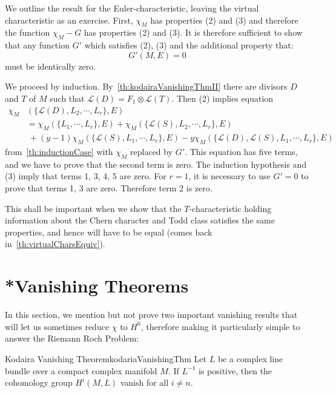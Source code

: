 \documentclass{book}
\newenvironment{Proof}[1][]
  {\begin{ProofTcb}[#1]}
  {\end{ProofTcb}}
\newcommand{\CL}{{\mathcal{L}}}
\begin{document}
\begin{Proof}
  We outline the result for the Euler-characteristic, leaving the virtual characteristic as an exercise.
  First, $\chi_M$ has properties (2) and (3) and therefore the function $\chi_M-G$ has properties (2) and (3).
  It is therefore sufficient to show that any function $G'$ which satisfies (2), (3) and the additional property
  that:
  \[
    G'(M,E)=0
  \]
  must be identically zero.

  We proceed by induction. By~\cref{th:kodairaVanishingThmII} there are divisors $D$ and $T$ of $M$ such that $\CL(D)=F_1\otimes\CL(T)$.
  Then (2) implies equation
  \begin{align*}
    \chi_M&(\{ \CL(D),L_2,\cdots,L_r \},E)\\
    &= \chi_M(\{ L_1,\cdots,L_r \},E) + \chi_M(\{ \CL(S),L_2,\cdots,L_r \},E) \\
                        &\ + (y-1)\chi_M(\{\CL(S),L_1,\cdots,L_r\},E)
                        - y\chi_M(\{\CL(D),\CL(S),L_1,\cdots,L_r\},E)
  \end{align*}
  from~\cref{th:inductionCase} with $\chi_M$ replaced by $G'$. This equation has five terms, and we have to
  prove that the second term is zero. The induction hypothesis and (3) imply that terms 1, 3, 4, 5 are zero.
  For $r=1$, it is necessary to use $G'=0$ to prove that terms 1, 3 are zero. Therefore term 2 is zero.
\end{Proof}

This shall be important when we show that the $T$-characteristic holding information about the Chern character
and Todd class satisfies the same properties, and hence will have to be equal (comes back in~\cref{th:virtualCharsEquiv}).

\section{*Vanishing Theorems}\label{sec:Kodaira}

In this section, we mention but not prove two important vanishing results that will let us sometimes
reduce $\chi$ to $H^0$, therefore making it particularly simple to answer the Riemann Roch Problem:
\begin{thm}{Kodaira Vanishing Theorem}{kodariaVanishingThm}
  Let $L$ be a complex line bundle over a compact complex manifold $M$. If $L^{-1}$ is positive, then the
  cohomology group $H^i(M, L)$ vanish for all $i \ne n$.
\end{thm}
\end{document}
